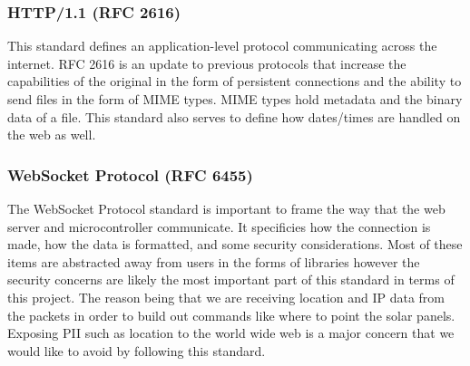 \subsubsection{HTTP/1.1 (RFC 2616)}
This standard defines an application-level protocol communicating across the internet. RFC 2616 is an update to previous protocols that increase the capabilities of the original in the form of persistent connections and the ability to send files in the form of MIME types. MIME types hold metadata and the binary data of a file. This standard also serves to define how dates/times are handled on the web as well.
\subsubsection{WebSocket Protocol (RFC 6455)} \label{websocket_protocol}
The WebSocket Protocol standard is important to frame the way that the web server and microcontroller communicate. It specificies how the connection is made, how the data is formatted, and some security considerations. Most of these items are abstracted away from users in the forms of libraries however the security concerns are likely the most important part of this standard in terms of this project. The reason being that we are receiving location and IP data from the packets in order to build out commands like where to point the solar panels. Exposing PII such as location to the world wide web is a major concern that we would like to avoid by following this standard.
